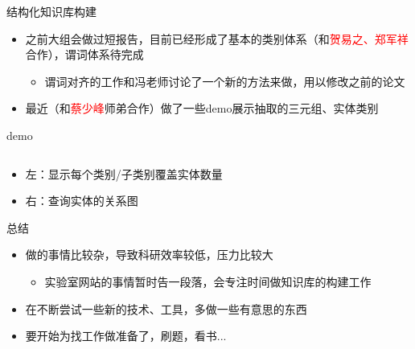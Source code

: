\documentclass[color=usenames,dvipsnames]{beamer}
\newcommand{\red}[1]{\textcolor{red}{#1}}
\begin{document}
\begin{frame}{结构化知识库构建}
 \begin{itemize}\small
  \item 之前大组会做过短报告，目前已经形成了基本的类别体系（和\red{贺易之、郑军祥}合作），谓词体系待完成
    \begin{itemize}
     \item 谓词对齐的工作和冯老师讨论了一个新的方法来做，用以修改之前的论文
    \end{itemize}
  \item 最近（和\red{蔡少峰}师弟合作）做了一些demo展示抽取的三元组、实体类别
 \end{itemize}
\end{frame}

\begin{frame}{demo}
\begin{columns}
 \column{0.5\hsize}
\centering{}
 \column{0.5\hsize}
\centering{}
\end{columns}
 \begin{itemize}\footnotesize
  \item 左：显示每个类别/子类别覆盖实体数量
  \item 右：查询实体的关系图
 \end{itemize}

\end{frame}

\begin{frame}{总结}
 \begin{itemize}
  \item 做的事情比较杂，导致科研效率较低，压力比较大
    \begin{itemize}
     \item 实验室网站的事情暂时告一段落，会专注时间做知识库的构建工作
    \end{itemize}
  \item 在不断尝试一些新的技术、工具，多做一些有意思的东西
  \item 要开始为找工作做准备了，刷题，看书...
 \end{itemize}
\end{frame}


\end{document}
